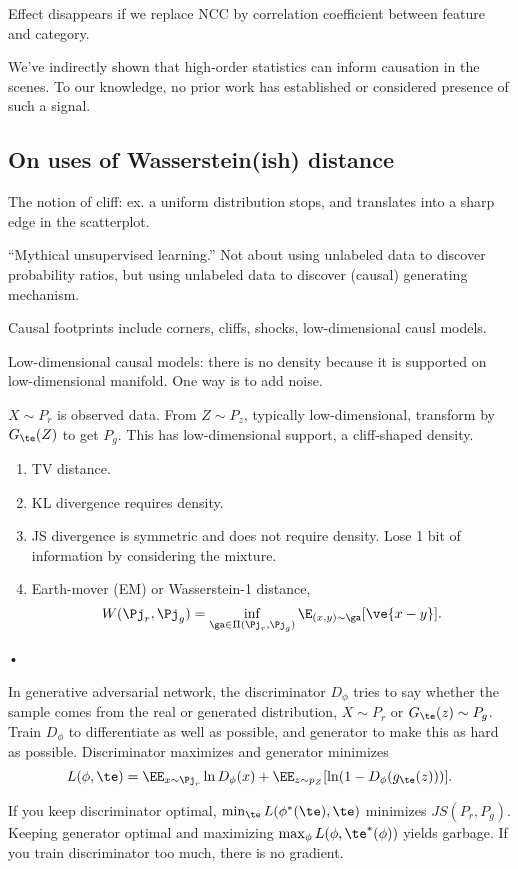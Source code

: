 Effect disappears if we replace NCC by correlation coefficient between feature and category.

We've indirectly shown that high-order statistics can inform causation in the scenes. To our knowledge, no prior work has established or considered presence of such a signal.

\subsection{On uses of Wasserstein(ish) distance}

The notion of cliff: ex. a uniform distribution stops, and translates into a sharp edge in the scatterplot.

``Mythical unsupervised learning.'' Not about using unlabeled data to discover probability ratios, but using unlabeled data to discover (causal) generating mechanism.

Causal footprints include corners, cliffs, shocks, low-dimensional causl models.

Low-dimensional causal models: there is no density because it is supported on low-dimensional manifold. One way is to add noise.

$X\sim P_r$ is observed data. From $Z\sim P_z$, typically low-dimensional, transform by $G_\te(Z)$ to get $P_g$. This has low-dimensional support, a cliff-shaped density.
\begin{enumerate}
\item
TV distance.
\item
KL divergence requires density.
\item
 JS divergence is symmetric and does not require density.
Lose 1 bit of information by considering the mixture.
\item
Earth-mover (EM) or Wasserstein-1 distance, 
$$
W(\Pj_r,\Pj_g) = \inf_{\ga\in \Pi(\Pj_r,\Pj_g)} \E_{(x,y)\sim \ga} [\ve{x-y}].
$$
\end{enumerate}•

In generative adversarial network, the discriminator $D_\phi$ tries to say whether the sample comes from the real or generated distribution, $X\sim P_r$ or $G_\te(z)\sim P_g$. Train $D_\phi$ to differentiate as well as possible, and generator to make this as hard as possible. Discriminator maximizes and generator minimizes
$$L(\phi,\te) = \EE_{x\sim \Pj_r} \ln D_\phi(x) + \EE_{z\sim p_Z}[\ln (1-D_\phi(g_\te(z)))].$$

If you keep discriminator optimal, $\min_\te L(\phi^*(\te), \te)$ minimizes $JS(P_r,P_g)$. Keeping generator optimal and maximizing $\max_\phi L(\phi,\te^*(\phi))$ yields garbage.
If you train discriminator too much, there is no gradient.

